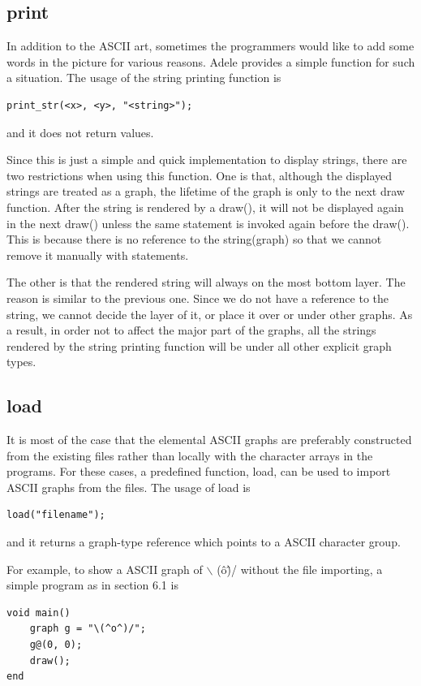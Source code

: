 \documentclass[11pt,letterpaper]{article}
\begin{document}
\subsection {print}
In addition to the ASCII art, sometimes the programmers would like to add some words in the picture for various reasons. Adele provides a simple function for such a situation. The usage of the string printing function is
\begin{lstlisting}[tabsize=4]
	print_str(<x>, <y>, "<string>");
\end{lstlisting}
and it does not return values.

Since this is just a simple and quick implementation to display strings, there are two restrictions when using this function. One is that, although the displayed strings are treated as a graph, the lifetime of the graph is only to the next draw function. After the string is rendered by a draw(), it will not be displayed again in the next draw() unless the same statement is invoked again before the draw(). This is because there is no reference to the string(graph) so that we cannot remove it manually with statements.

The other is that the rendered string will always on the most bottom layer. The reason is similar to the previous one. Since we do not have a reference to the string, we cannot decide the layer of it, or place it over or under other graphs. As a result, in order not to affect the major part of the graphs, all the strings rendered by the string printing function will be under all other explicit graph types.

\subsection {load}
It is most of the case that the elemental ASCII graphs are preferably constructed from the existing files rather than locally with the character arrays in the programs. For these cases, a predefined function, load, can be used to import ASCII graphs from the files. The usage of load is
\begin{lstlisting}[tabsize=4]
	load("filename");
\end{lstlisting}
and it returns a graph-type reference which points to a ASCII character group.

For example, to show a ASCII graph of $\backslash$ (\^o\^)/ without the file importing, a simple program as in section 6.1 is
\begin{lstlisting}[caption=hail.adl, label=hail, captionpos=b, tabsize=4, frame=single]
void main()
	graph g = "\(^o^)/";
	g@(0, 0);
	draw();
end
\end{lstlisting}
\end{document}
